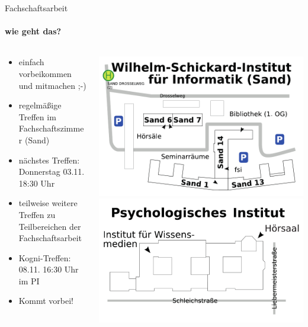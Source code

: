\documentclass{beamer}
\begin{document}
	\begin{frame}{Fachschaftsarbeit}
		\framesubtitle{wie geht das?}
		\begin{columns}
			\begin{column}{.5\linewidth}
				\begin{itemize}
					\item einfach vorbeikommen und mitmachen ;-)
					\item regelmäßige Treffen im Fachschaftszimmer (Sand)
					\item nächstes Treffen: \\Donnerstag 03.11. 18:30 Uhr
					\item teilweise weitere Treffen zu Teilbereichen der Fachschaftsarbeit
					\item Kogni-Treffen: \\08.11. 16:30 Uhr im PI
					\item Kommt vorbei!
				\end{itemize}
			\end{column}
			\begin{column}{0.5\linewidth}
				\includegraphics[width=\linewidth]{pictures/uebersicht_sand.pdf}\\
				\includegraphics[width=\linewidth]{pictures/uebersicht_pi.pdf}\\
			\end{column}
		\end{columns}
	\end{frame}
\end{document}
